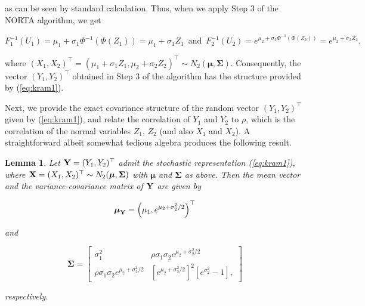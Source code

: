 \documentclass[
]{jss}
\newtheorem{lemma}[theorem]{Lemma}
\begin{document}
as can be seen by standard calculation. Thus, when we apply Step 3 of the NORTA algorithm, we get

\begin{equation}
\label{eq:kram5}
F_1^{-1}(U_1) = \mu_1+\sigma_1 \Phi^{-1}(\Phi(Z_1)) =  \mu_1+\sigma_1 Z_1 \,\,\, \mbox{and} \,\,\, F_2^{-1}(U_2) = e^{\mu_2+\sigma_2 \Phi^{-1}(\Phi(Z_2))} = e^{\mu_2+\sigma_2 Z_2}, 
\end{equation}

where \((X_1, X_2)^\top = (\mu_1+\sigma_1 Z_1, \mu_2+\sigma_2 Z_2)^\top \sim N_2(\boldsymbol \mu, \boldsymbol \Sigma)\). Consequently, the vector \((Y_1, Y_2)^\top\) obtained in Step 3 of the algorithm has the structure provided by (\ref{eq:kram1}).

\vspace{0.1in}

\noindent Next, we provide the exact covariance structure of the random vector \((Y_1, Y_2)^\top\) given by (\ref{eq:kram1}), and relate the correlation of \(Y_1\) and \(Y_2\) to \(\rho\), which is the correlation of the normal variables \(Z_1\), \(Z_2\) (and also \(X_1\) and \(X_2\)). A straightforward albeit somewhat tedious algebra produces the following result.

\begin{lemma}
Let ${\bf Y} = (Y_1, Y_2)^\top$ admit the stochastic representation (\ref{eq:kram1}), where ${\bf X} = (X_1, X_2)^\top \sim N_2(\boldsymbol \mu, \boldsymbol \Sigma)$ with $\boldsymbol \mu$ and $\boldsymbol \Sigma$ as above. Then the mean vector and the variance-covariance matrix of ${\bf Y}$ are given by 

\begin{equation}
\label{eq:kram6}
\boldsymbol \mu_{{\bf Y}} = \left(\mu_1, e^{\mu_2+\sigma_2^2/2}\right)^\top
\end{equation}

and 

\begin{equation}
\label{eq:kram7}
\boldsymbol \Sigma = 
\begin{bmatrix}
\sigma_1^2 & \rho \sigma_1\sigma_2  e^{\mu_2+\sigma_2^2/2}  \\
\rho \sigma_1\sigma_2 e^{\mu_2+\sigma_2^2/2} & \left[ e^{\mu_2+\sigma_2^2/2}\right]^2 \left[e^{\sigma_2^2} -1 \right],
\end{bmatrix}
\end{equation}

respectively. 
\end{lemma}
\end{document}
